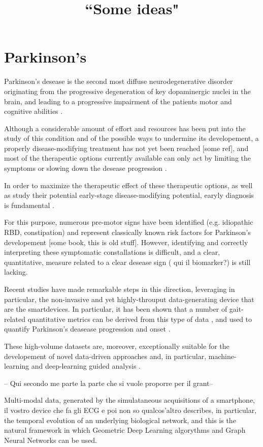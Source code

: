 \documentclass{article}
\title{``Some ideas"}
\author{}
\begin{document}
\maketitle


\section{Parkinson's}
Parkinson's desease is the second most diffuse neurodegenerative disorder
originating from the progressive degeneration of key dopaminergic nuclei in the
brain, and leading to a progressive impairment of the patients motor and
cognitive abilities \cite{Pringsheim2014ThePO}.

Although a considerable amount of effort and resources has been put into the
study of this condition and of the possible ways to undermine its developement,
a properly disease-modifying treatment has not yet been reached [some ref], and
most of the therapeutic options currently available can only act by limiting
the symptoms or slowing down the desease progression \cite{Marras2020TherapyOP}.

In order to maximize the therapeutic effect of these therapeutic options, as well
as study their potential early-stage disease-modifying potential, earyly diagnosis
is fundamental \cite{Pagn2012ImprovingOT}. 

For this purpose, numerous pre-motor signs have been  identified (e.g. 
idiopathic RBD, constipation) and represent classically known risk factors for 
Parkinson's developement [some book, this is old stuff]. However, identifying and
correctly interpreting these symptomatic constallations is difficult, and a clear,
quantitative, measure related to a clear desease sign ({\color{blue} qui il 
biomarker?}) is still lacking. 

Recent studies have made remarkable steps in this direction, leveraging in
particular, the non-invasive and yet highly-throuput data-generating device
that are the smartdevices. In particular, it has been shown that a number of
gait-related quantitative metrics can be derived from this type of data
\cite{Reimer2022Evaluating3H}, and used to quantify Parkinson's deasease
progression and onset \cite{Shahar2021GaitAU}. 

These high-volume datasets are, moreover, exceptionally suitable for the developement
of novel data-driven approaches and, in particular, machine-learning and deep-learning
guided analysis \cite{Mei2021MachineLF}. 

{--\color{red} Qui secondo me parte la parte che si vuole proporre per il grant--}

Multi-modal data, generated by the simulataneous acquisitions of a smartphone, {\color{red}
il vostro device che fa gli ECG e poi non so qualcos'altro} describes, in particular,
the temporal evolution of an underlying biological network, and this is the natural 
framework in which Geometric Deep Learning algorythms and Graph Neural Networks can be used.









\printbibliography
\end{document}
